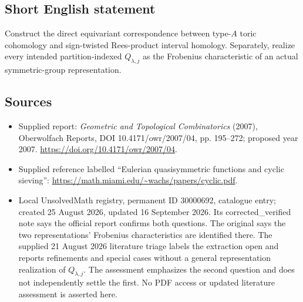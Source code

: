 \documentclass[11pt]{article}
\begin{document}
\subsection{Short English statement}
Construct the direct equivariant correspondence between type-$A$ toric cohomology and sign-twisted Rees-product interval homology. Separately, realize every intended partition-indexed $Q_{\lambda,j}$ as the Frobenius characteristic of an actual symmetric-group representation.
\subsection{Sources}
\begin{itemize}
\item Supplied report: \emph{Geometric and Topological Combinatorics} (2007), Oberwolfach Reports, DOI 10.4171/owr/2007/04, pp. 195--272; proposed year 2007. \url{https://doi.org/10.4171/owr/2007/04}.
\item Supplied reference labelled ``Eulerian quasisymmetric functions and cyclic sieving'': \url{https://math.miami.edu/~wachs/papers/cyclic.pdf}.
\item Local UnsolvedMath registry, permanent ID 30000692, catalogue entry; created 25 August 2026, updated 16 September 2026. Its corrected\_verified note says the official report confirms both questions. The original says the two representations' Frobenius characteristics are identified there. The supplied 21 August 2026 literature triage labels the extraction open and reports refinements and special cases without a general representation realization of $Q_{\lambda,j}$. The assessment emphasizes the second question and does not independently settle the first. No PDF access or updated literature assessment is asserted here.
\end{itemize}
\end{document}
